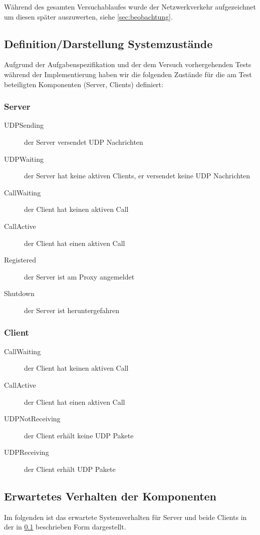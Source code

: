 \documentclass[10pt]{scrartcl}
\begin{document}
Während des gesamten Versuchablaufes wurde der Netzwerkverkehr aufgezeichnet um diesen später auszuwerten, siehe \ref{sec:beobachtung}.

\subsection{Definition/Darstellung Systemzustände}\label{subsec:systemzusatende}
Aufgrund der Aufgabenspezifikation und der dem Versuch vorhergehenden Tests während der Implementierung haben wir die folgenden Zustände für die am Test beteiligten Komponenten (Server, Clients) definiert:


\subsubsection{Server}
	\begin{description}
		\item[UDPSending] der Server versendet UDP Nachrichten
		\item[UDPWaiting] der Server hat keine aktiven Clients, er versendet keine UDP Nachrichten
		\item[CallWaiting] der Client hat keinen aktiven Call
		\item[CallActive] der Client hat einen aktiven Call
		\item[Registered] der Server ist am Proxy angemeldet
		\item[Shutdown] der Server ist heruntergefahren
	\end{description}
	
\subsubsection{Client}	
	\begin{description}
		\item[CallWaiting] der Client hat keinen aktiven Call
		\item[CallActive] der Client hat einen aktiven Call
		\item[UDPNotReceiving] der Client erhält keine UDP Pakete
		\item[UDPReceiving] der Client erhält UDP Pakete
	\end{description}	
	

\subsection{Erwartetes Verhalten der Komponenten}\label{subsec:erwartetesSystemverhalten}
Im folgenden ist das erwartete Systemverhalten für Server und beide Clients in der in \ref{subsec:systemzusatende} beschrieben Form dargestellt.
\end{document}

